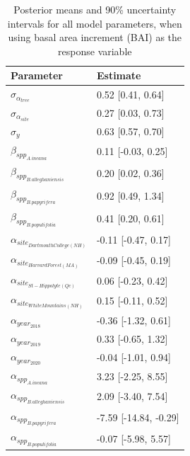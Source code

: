 \begin{table}[ht]
\centering
\caption{Posterior means and 90\% uncertainty intervals for all model parameters, when using basal area increment (BAI) as the response variable} 
\label{tab:BAItab}
\begin{tabular}{ll}
  \hline
Parameter & Estimate \\ 
  \hline
$\sigma_{\alpha_{tree}}$ & 0.52 [0.41, 0.64] \\ 
  $\sigma_{\alpha_{site}}$ & 0.27 [0.03, 0.73] \\ 
  $\sigma_{y}$ & 0.63 [0.57, 0.70] \\ 
  $\beta_{spp_{A. incana}}$ & 0.11 [-0.03, 0.25] \\ 
  $\beta_{spp_{B. alleghaniensis}}$ & 0.20 [0.02, 0.36] \\ 
  $\beta_{spp_{B. papyrifera}}$ & 0.92 [0.49, 1.34] \\ 
  $\beta_{spp_{B. populifolia}}$ & 0.41 [0.20, 0.61] \\ 
  $\alpha_{site_{Dartmouth College (NH)}}$ & -0.11 [-0.47, 0.17] \\ 
  $\alpha_{site_{Harvard Forest (MA)}}$ & -0.09 [-0.45, 0.19] \\ 
  $\alpha_{site_{St-Hippolyte (Qc)}}$ & 0.06 [-0.23, 0.42] \\ 
  $\alpha_{site_{White Mountains (NH)}}$ & 0.15 [-0.11, 0.52] \\ 
  $\alpha_{year_{2018}}$ & -0.36 [-1.32, 0.61] \\ 
  $\alpha_{year_{2019}}$ & 0.33 [-0.65, 1.32] \\ 
  $\alpha_{year_{2020}}$ & -0.04 [-1.01, 0.94] \\ 
  $\alpha_{spp_{A. incana}}$ & 3.23 [-2.25, 8.55] \\ 
  $\alpha_{spp_{B. alleghaniensis}}$ & 2.09 [-3.40, 7.54] \\ 
  $\alpha_{spp_{B. papyrifera}}$ & -7.59 [-14.84, -0.29] \\ 
  $\alpha_{spp_{B. populifolia}}$ & -0.07 [-5.98, 5.57] \\ 
   \hline
\end{tabular}
\end{table}


\clearpage

